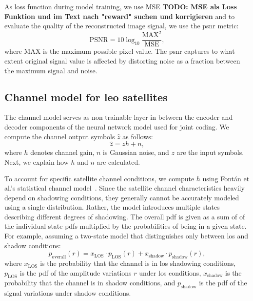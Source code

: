 \documentclass[conference]{IEEEtran}
\begin{document}
As loss function during model training, we use MSE \textbf{TODO: MSE als Loss Funktion und im Text nach "reward" suchen und korrigieren} and to evaluate the quality of the reconstructed image signal, we use the \ac{psnr} metric:
%
\begin{equation}
  \mathrm{PSNR} = 10 \log_{10}\frac{\mathrm{MAX}^2}{\mathrm{MSE}},
\end{equation}
%
where $\mathrm{MAX}$ is the maximum possible pixel value.
The \ac{psnr} captures to what extent original signal value is affected by distorting noise as a fraction between the maximum signal and noise.


\subsection{Channel model for \ac{leo} satellites}
\label{sub:channel_model}

The channel model serves as non-trainable layer in between the encoder and decoder components of the neural network model used for joint coding.
We compute the channel output symbols $\hat{z}$ as follows:
\begin{equation}
  \hat{z} = zh + n,
\end{equation}
where $h$ denotes channel gain, $n$ is Gaussian noise, and $z$ are the input symbols.
Next, we explain how $h$ and $n$ are calculated.

To account for specific satellite channel conditions, we compute $h$ using Fontán et al.'s statistical channel model~\cite{966585}. 
Since the satellite channel characteristics heavily depend on shadowing conditions, 
they generally cannot be accurately modeled using a single distribution.
Rather, the model introduces multiple states describing different degrees of shadowing. 
The overall \ac{pdf} is given as a sum of of the individual state \acp{pdf} multiplied by the probabilities of being in a given state.
For example, assuming a two-state model that distinguishes only between \ac{los} and shadow conditions: 
%
\begin{equation}
p_{\mathrm{overall}}(r) = x_{\mathrm{LOS}} \cdot p_{\mathrm{LOS}}(r)
  + x_{\mathrm{shadow}} \cdot p_{\mathrm{shadow}}(r),
\end{equation}
%
where $x_{\mathrm{LOS}}$ is the probability that the channel is in \ac{los} shadowing conditions, $p_{\mathrm{LOS}}$ is the \ac{pdf} of the amplitude variations $r$ under \ac{los} conditions, $x_{\mathrm{shadow}}$ is the probability that the channel is in shadow conditions, and $p_{\mathrm{shadow}}$ is the \ac{pdf} of the signal variations under shadow conditions.
\end{document}
